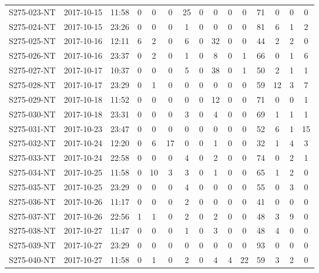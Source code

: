 \begin{longtable}{ccccccccccccccc}
  S275-023-NT & 2017-10-15 & 11:58 & 0 & 0 & 0 & 25 & 0 & 0 & 0 & 0 & 71 & 0 & 0 & 0 \\ 
  S275-024-NT & 2017-10-15 & 23:26 & 0 & 0 & 0 & 1 & 0 & 0 & 0 & 0 & 81 & 6 & 1 & 2 \\ 
  S275-025-NT & 2017-10-16 & 12:11 & 6 & 2 & 0 & 6 & 0 & 32 & 0 & 0 & 44 & 2 & 2 & 0 \\ 
  S275-026-NT & 2017-10-16 & 23:37 & 0 & 2 & 0 & 1 & 0 & 8 & 0 & 1 & 66 & 0 & 1 & 6 \\ 
  S275-027-NT & 2017-10-17 & 10:37 & 0 & 0 & 0 & 5 & 0 & 38 & 0 & 1 & 50 & 2 & 1 & 1 \\ 
  S275-028-NT & 2017-10-17 & 23:29 & 0 & 1 & 0 & 0 & 0 & 0 & 0 & 0 & 59 & 12 & 3 & 7 \\ 
  S275-029-NT & 2017-10-18 & 11:52 & 0 & 0 & 0 & 0 & 0 & 12 & 0 & 0 & 71 & 0 & 0 & 1 \\ 
  S275-030-NT & 2017-10-18 & 23:31 & 0 & 0 & 0 & 3 & 0 & 4 & 0 & 0 & 69 & 1 & 1 & 1 \\ 
  S275-031-NT & 2017-10-23 & 23:47 & 0 & 0 & 0 & 0 & 0 & 0 & 0 & 0 & 52 & 6 & 1 & 15 \\ 
  S275-032-NT & 2017-10-24 & 12:20 & 0 & 6 & 17 & 0 & 0 & 1 & 0 & 0 & 32 & 1 & 4 & 3 \\ 
  S275-033-NT & 2017-10-24 & 22:58 & 0 & 0 & 0 & 4 & 0 & 2 & 0 & 0 & 74 & 0 & 2 & 1 \\ 
  S275-034-NT & 2017-10-25 & 11:58 & 0 & 10 & 3 & 3 & 0 & 1 & 0 & 0 & 65 & 1 & 2 & 0 \\ 
  S275-035-NT & 2017-10-25 & 23:29 & 0 & 0 & 0 & 4 & 0 & 0 & 0 & 0 & 55 & 0 & 3 & 0 \\ 
  S275-036-NT & 2017-10-26 & 11:17 & 0 & 0 & 0 & 2 & 0 & 0 & 0 & 0 & 41 & 0 & 0 & 0 \\ 
  S275-037-NT & 2017-10-26 & 22:56 & 1 & 1 & 0 & 2 & 0 & 2 & 0 & 0 & 48 & 3 & 9 & 0 \\ 
  S275-038-NT & 2017-10-27 & 11:47 & 0 & 0 & 0 & 1 & 0 & 3 & 0 & 0 & 48 & 4 & 0 & 0 \\ 
  S275-039-NT & 2017-10-27 & 23:29 & 0 & 0 & 0 & 0 & 0 & 0 & 0 & 0 & 93 & 0 & 0 & 0 \\ 
  S275-040-NT & 2017-10-27 & 11:58 & 0 & 1 & 0 & 2 & 0 & 4 & 4 & 22 & 59 & 3 & 2 & 0 \\ 
  \hline
\end{longtable}

